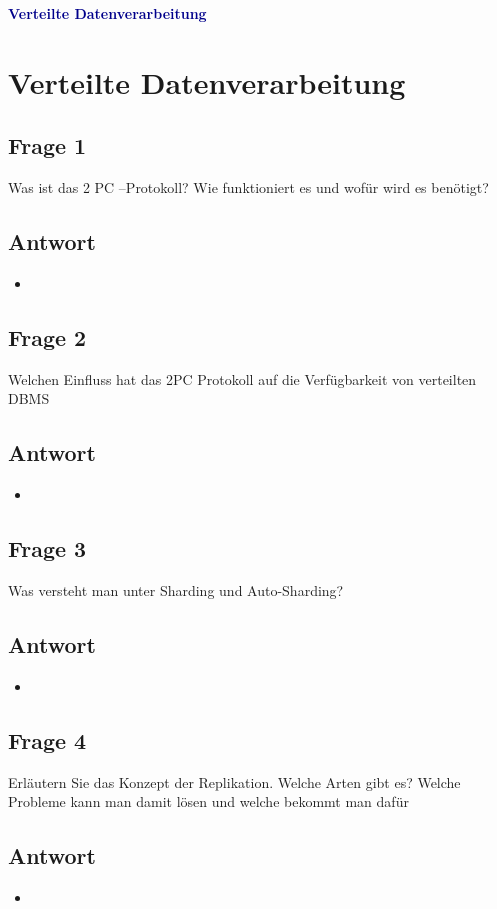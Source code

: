 \textbf{\textcolor{darkblue}{ Verteilte Datenverarbeitung}}~

\section*{Verteilte Datenverarbeitung}
\subsection*{Frage 1}
Was ist das 2 PC –Protokoll? Wie funktioniert es und wofür wird es benötigt?
\subsection*{Antwort}
\begin{itemize}
	\item 
\end{itemize}

\subsection*{Frage 2}
Welchen Einfluss hat das 2PC Protokoll auf die Verfügbarkeit von verteilten DBMS
\subsection*{Antwort}
\begin{itemize}
	\item 
\end{itemize}

\subsection*{Frage 3}
Was versteht man unter Sharding und Auto-Sharding?
\subsection*{Antwort}
\begin{itemize}
	\item 
\end{itemize}
\subsection*{Frage 4}
Erläutern Sie das Konzept der Replikation. Welche Arten gibt es? Welche Probleme kann man damit lösen und welche bekommt man dafür
\subsection*{Antwort}
\begin{itemize}
	\item 
\end{itemize}
